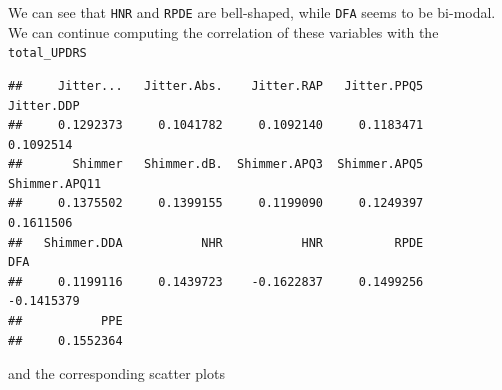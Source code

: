 \documentclass[
]{article}
\newenvironment{Shaded}{\begin{snugshade}}{\end{snugshade}}
\newcommand{\AttributeTok}[1]{\textcolor[rgb]{0.13,0.29,0.53}{#1}}
\newcommand{\ControlFlowTok}[1]{\textcolor[rgb]{0.13,0.29,0.53}{\textbf{#1}}}
\newcommand{\DecValTok}[1]{\textcolor[rgb]{0.00,0.00,0.81}{#1}}
\newcommand{\FunctionTok}[1]{\textcolor[rgb]{0.13,0.29,0.53}{\textbf{#1}}}
\newcommand{\NormalTok}[1]{#1}
\newcommand{\OtherTok}[1]{\textcolor[rgb]{0.56,0.35,0.01}{#1}}
\newcommand{\SpecialCharTok}[1]{\textcolor[rgb]{0.81,0.36,0.00}{\textbf{#1}}}
\newcommand{\StringTok}[1]{\textcolor[rgb]{0.31,0.60,0.02}{#1}}
\begin{document}
We can see that \texttt{HNR} and \texttt{RPDE} are bell-shaped, while
\texttt{DFA} seems to be bi-modal.\\
We can continue computing the correlation of these variables with the
\texttt{total\_UPDRS}

\begin{Shaded}
\end{Shaded}

\begin{verbatim}
##     Jitter...   Jitter.Abs.    Jitter.RAP   Jitter.PPQ5    Jitter.DDP 
##     0.1292373     0.1041782     0.1092140     0.1183471     0.1092514 
##       Shimmer   Shimmer.dB.  Shimmer.APQ3  Shimmer.APQ5 Shimmer.APQ11 
##     0.1375502     0.1399155     0.1199090     0.1249397     0.1611506 
##   Shimmer.DDA           NHR           HNR          RPDE           DFA 
##     0.1199116     0.1439723    -0.1622837     0.1499256    -0.1415379 
##           PPE 
##     0.1552364
\end{verbatim}

and the corresponding scatter plots

\begin{Shaded}
\end{Shaded}
\end{document}
